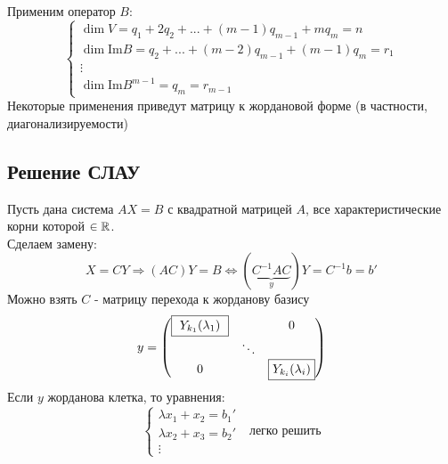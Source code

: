     Применим оператор $B$:
    $$\begin{cases}
        \dim V = q_1 + 2q_2 + ... + (m-1)q_{m-1} + mq_m = n\\
        \dim \text{Im}B = q_2 + ... + (m-2)q_{m-1} + (m-1)q_m = r_1\\
        \vdots \\
        \dim \text{Im}B^{m-1} = q_m = r_{m-1}
    \end{cases}$$  
    Некоторые применения приведут матрицу к жордановой форме (в частности, диагонализируемости)
    \subsection{Решение СЛАУ}
    Пусть дана система $AX = B$ с квадратной матрицей $A$, все характеристические корни которой $\in \mathbb{R}$.\\
    Сделаем замену: 
    $$X = CY \Longrightarrow (AC)Y = B \Longleftrightarrow (\underbrace{C^{-1}AC}_{y} )Y = C^{-1}b=b'$$
    Можно взять $C$ - матрицу перехода к жорданову базису
    $$y = \begin{pmatrix}
        \text{\fbox{ $Y_{k_1}(\lambda_1)$ }} & \null & 0\\
        \null & \ddots \\
        0 & \null & \text{\fbox{$Y_{k_i}(\lambda_i)$}}
    \end{pmatrix}$$
    Если $y$ жорданова клетка, то уравнения:
    $$\begin{cases}
        \lambda x_1 + x_2 = b_1'\\
        \lambda x_2 + x_3 = b_2'\\
        \vdots
    \end{cases} \ \ \ \text{легко решить}$$
